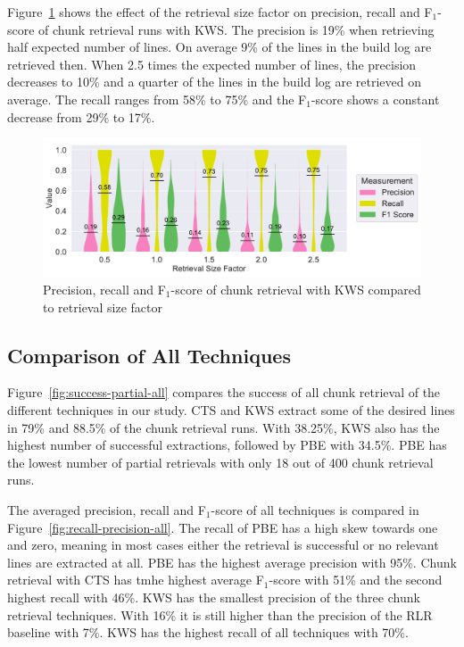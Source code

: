 \documentclass[\myrootdir/main.tex]{subfiles}
\begin{document}
Figure~\ref{fig:contextsizefactor-precision-recall-KWS} shows the effect of the retrieval size factor on precision, recall and F$_{1}$-score of chunk retrieval runs with KWS\@.
The precision is 19\% when retrieving half expected number of lines. On average 9\% of the lines in the build log are retrieved then.
When 2.5 times the expected number of lines, the precision decreases to 10\% and a quarter of the lines in the build log are retrieved on average.
The recall ranges from 58\% to 75\% and the F$_{1}$-score shows a constant decrease from 29\% to 17\%.

\begin{figure}[htbp]
		\centering
		\includegraphics[width=\textwidth, clip]{img/big-study/contextsizefactor-precision-recall-KWS.pdf}
		\caption{Precision, recall and F$_{1}$-score of chunk retrieval with KWS compared to retrieval size factor}
		\label{fig:contextsizefactor-precision-recall-KWS}
\end{figure}

\subsection{Comparison of All Techniques}
Figure~\ref{fig:success-partial-all} compares the success of all chunk retrieval of the different techniques in our study.
CTS and KWS extract some of the desired lines in 79\% and 88.5\% of the chunk retrieval runs.
With 38.25\%, KWS also has the highest number of successful extractions, followed by PBE with 34.5\%.
PBE has the lowest number of partial retrievals with only 18 out of 400 chunk retrieval runs.

The averaged precision, recall and F$_{1}$-score of all techniques is compared in Figure~\ref{fig:recall-precision-all}.
The recall of PBE has a high skew towards one and zero, meaning in most cases either the retrieval is successful or no relevant lines are extracted at all.
PBE has the highest average precision with 95\%.
Chunk retrieval with CTS has tmhe highest average F$_{1}$-score with 51\% and the second highest recall with 46\%.
KWS has the smallest precision of the three chunk retrieval techniques.
With 16\% it is still higher than the precision of the RLR baseline with 7\%.
KWS has the highest recall of all techniques with 70\%.
\end{document}
